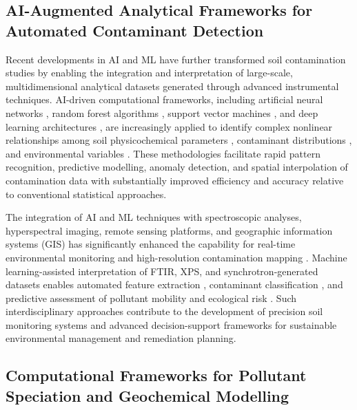 \documentclass[preprint,12pt]{elsarticle}            %
\begin{document}
\subsection{AI-Augmented Analytical Frameworks for Automated Contaminant
    Detection}\label{sec3.2}

Recent developments in AI and ML have further transformed soil contamination
studies by enabling the integration and interpretation of large-scale,
multidimensional analytical datasets generated through advanced instrumental
techniques. AI-driven computational frameworks, including artificial neural
networks \cite{Aljanabi2025,Anifowose2024}, random forest algorithms
\cite{Shaheen2018,Foronda2023}, support vector machines
\cite{Agyeman2022,Gholizadeh2020}, and deep learning architectures
\cite{Hu2024,MLReview2024}, are increasingly applied to identify complex
nonlinear relationships among soil physicochemical parameters
\cite{Aljanabi2025,Kammerlander2025}, contaminant distributions
\cite{Agyeman2022,Shaheen2018}, and environmental variables
\cite{Anifowose2024,Gholizadeh2020}. These methodologies facilitate rapid
pattern recognition, predictive modelling, anomaly detection, and spatial
interpolation of contamination data with substantially improved efficiency and
accuracy relative to conventional statistical approaches.

The integration of AI and ML techniques with spectroscopic analyses,
hyperspectral imaging, remote sensing platforms, and geographic information
systems (GIS) has significantly enhanced the capability for real-time
environmental monitoring and high-resolution contamination mapping
\cite{Gholizadeh2020,Hu2024,Lemenkova2025f}. Machine learning-assisted
interpretation of FTIR, XPS, and synchrotron-generated datasets enables
automated feature extraction \cite{Zhou2023,Caporaso2018}, contaminant
classification \cite{Agyeman2022,Hu2024}, and predictive assessment of
pollutant mobility and ecological risk
\cite{Shaheen2018,Anifowose2024,Foronda2023,Gholizadeh2020}. Such
interdisciplinary approaches contribute to the development of precision soil
monitoring systems and advanced decision-support frameworks for sustainable
environmental management and remediation planning.

\subsection{Computational Frameworks for Pollutant Speciation and
    Geochemical Modelling}\label{sec3.3}
\end{document}
